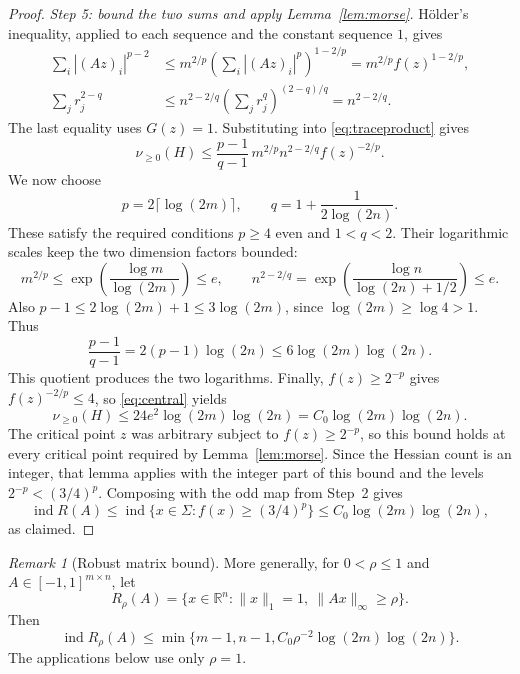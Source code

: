 \documentclass[11pt]{article}
\theoremstyle{remark}
\newtheorem{remark}[theorem]{Remark}
\DeclareMathOperator{\ind}{ind}
\newcommand{\R}{\mathbb R}
\newcommand{\Czero}{C_0}
\newcommand{\nuplus}{\nu_{\geq 0}}
\begin{document}
\begin{proof}
\smallskip
\noindent\emph{Step 5: bound the two sums and apply Lemma~\ref{lem:morse}.}
H\"older's inequality, applied to each sequence and the constant
sequence $1$, gives
\begin{align*}
 \sum_i|(Az)_i|^{p-2}
 &\leq m^{2/p}\left(\sum_i|(Az)_i|^p\right)^{1-2/p}
 =m^{2/p}f(z)^{1-2/p},\\
 \sum_jr_j^{2-q}
 &\leq n^{2-2/q}\left(\sum_jr_j^q\right)^{(2-q)/q}
 =n^{2-2/q}.
\end{align*}
The last equality uses $G(z)=1$.
Substituting into \eqref{eq:traceproduct} gives
\begin{equation}\label{eq:central}
 \nuplus(H)\leq
 \frac{p-1}{q-1}\,m^{2/p}n^{2-2/q}f(z)^{-2/p}.
\end{equation}
We now choose
\[
 p=2\lceil\log(2m)\rceil,\qquad
 q=1+\frac1{2\log(2n)}.
\]
These satisfy the required conditions $p\geq4$ even and $1<q<2$.
Their logarithmic scales keep the two dimension factors bounded:
\[
 m^{2/p}
 \leq\exp\!\left(\frac{\log m}{\log(2m)}\right)\leq e,
 \qquad
 n^{2-2/q}
 =\exp\!\left(\frac{\log n}{\log(2n)+1/2}\right)\leq e.
\]
Also $p-1\leq2\log(2m)+1\leq3\log(2m)$, since
$\log(2m)\geq\log4>1$. Thus
\[
 \frac{p-1}{q-1}
 =2(p-1)\log(2n)\leq6\log(2m)\log(2n).
\]
This quotient produces the two logarithms.
Finally, $f(z)\geq2^{-p}$ gives $f(z)^{-2/p}\leq4$, so
\eqref{eq:central} yields
\[
 \nuplus(H)\leq24e^2\log(2m)\log(2n)
 =\Czero\log(2m)\log(2n).
\]
The critical point $z$ was arbitrary subject to $f(z)\geq2^{-p}$,
so this bound holds at every critical point required by
Lemma~\ref{lem:morse}.
Since the Hessian count is an integer, that lemma applies with
the integer part of this bound and the levels $2^{-p}<(3/4)^p$.
Composing with the odd map from Step~2 gives
\[
 \ind R(A)
 \leq\ind\{x\in\Sigma:f(x)\geq(3/4)^p\}
 \leq\Czero\log(2m)\log(2n),
\]
as claimed.
\end{proof}

\begin{remark}[Robust matrix bound]\label{rem:robust-matrix}
More generally, for $0<\rho\leq1$ and $A\in[-1,1]^{m\times n}$, let
\[
 R_\rho(A)=\{x\in\R^n:\|x\|_1=1,\ \|Ax\|_\infty\geq\rho\}.
\]
Then
\[
 \ind R_\rho(A)\leq
 \min\{m-1,n-1,\Czero\rho^{-2}\log(2m)\log(2n)\}.
\]
The applications below use only $\rho=1$.
\end{remark}
\end{document}
